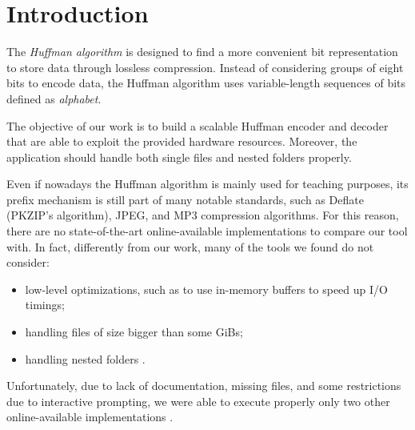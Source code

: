 \section{Introduction}
The \emph{Huffman algorithm} is designed to find a more convenient bit representation to store data through lossless compression. Instead of considering groups of eight bits to encode data, the Huffman algorithm uses variable-length sequences of bits defined as \emph{alphabet}.

The objective of our work is to build a scalable Huffman encoder and decoder that are able to exploit the provided hardware resources. Moreover, the application should handle both single files and nested folders properly.

Even if nowadays the Huffman algorithm is mainly used for teaching purposes, its prefix mechanism is still part of many notable standards, such as Deflate (PKZIP's algorithm), JPEG, and MP3 compression algorithms. For this reason, there are no state-of-the-art online-available implementations to compare our tool with. In fact, differently from our work, many of the tools we found do not consider:
\begin{itemize}
    \item low-level optimizations, such as to use in-memory buffers to speed up I/O timings\cite{HuffmanParallel,ParallelizedTextCompressio,HuffmanParallel2,Huffman,HuffmanCoding};
    \item handling files of size bigger than some GiBs\cite{HuffmanParallel,ParallelizedTextCompressio,ParallelHuffmanEncoding,HuffmanParallel2,HuffmanCoding,HuffmanCodingMPICUDA};
    \item handling nested folders \cite{HuffmanParallel,ParallelizedTextCompressio,ParallelHuffmanEncoding,HuffmanParallel2,Huffman,pdsAssignment4,HuffmanCoding,HuffmanCodingMPICUDA}.
\end{itemize}

Unfortunately, due to lack of documentation, missing files, and some restrictions due to interactive prompting, we were able to execute properly only two other online-available implementations \cite{HuffmanParallel2,HuffmanCodingMPICUDA}.